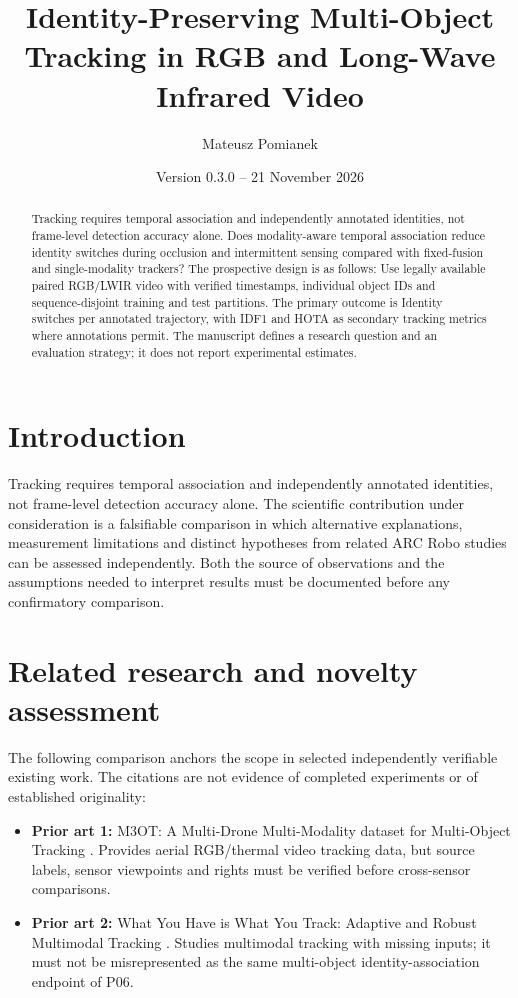 \documentclass[11pt,a4paper]{article}
\title{Identity-Preserving Multi-Object Tracking in RGB and Long-Wave Infrared Video}
\author{Mateusz Pomianek}
\date{Version 0.3.0 -- 21 November 2026}
\begin{document}
\maketitle

\begin{abstract}
Tracking requires temporal association and independently annotated identities, not frame-level detection accuracy alone. Does modality-aware temporal association reduce identity switches during occlusion and intermittent sensing compared with fixed-fusion and single-modality trackers? The prospective design is as follows: Use legally available paired RGB/LWIR video with verified timestamps, individual object IDs and sequence-disjoint training and test partitions. The primary outcome is Identity switches per annotated trajectory, with IDF1 and HOTA as secondary tracking metrics where annotations permit. The manuscript defines a research question and an evaluation strategy; it does not report experimental estimates.
\end{abstract}

\section{Introduction}
Tracking requires temporal association and independently annotated identities, not frame-level detection accuracy alone. The scientific contribution under consideration is a falsifiable comparison in which alternative explanations, measurement limitations and distinct hypotheses from related ARC Robo studies can be assessed independently. Both the source of observations and the assumptions needed to interpret results must be documented before any confirmatory comparison.

\section{Related research and novelty assessment}
The following comparison anchors the scope in selected independently verifiable existing work. The citations are not evidence of completed experiments or of established originality:
\begin{itemize}
\item \textbf{Prior art 1:} M3OT: A Multi-Drone Multi-Modality dataset for Multi-Object Tracking \cite{source1}. Provides aerial RGB/thermal video tracking data, but source labels, sensor viewpoints and rights must be verified before cross-sensor comparisons.
\item \textbf{Prior art 2:} What You Have is What You Track: Adaptive and Robust Multimodal Tracking \cite{source2}. Studies multimodal tracking with missing inputs; it must not be misrepresented as the same multi-object identity-association endpoint of P06.
\end{itemize}
\end{document}
